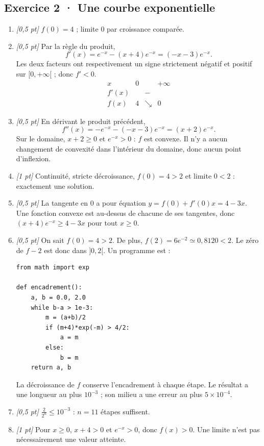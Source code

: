 \subsection*{Exercice 2 · Une courbe exponentielle}\begin{enumerate}

\item \textit{[0,5 pt]} $f(0)=4$ ; limite $0$ par croissance comparée.

\item \textit{[0,5 pt]} Par la règle du produit,
\[f'(x)=e^{-x}-(x+4)e^{-x}=(-x-3)e^{-x}.\]
Les deux facteurs ont respectivement un signe strictement négatif et positif sur $[0,+\infty[$ ; donc $f'<0$.
\[\begin{array}{c|ccc}x&0&&+\infty\\\hline f'(x)&&-&\\\hline f(x)&4&\searrow&0\end{array}\]

\item \textit{[0,5 pt]} En dérivant le produit précédent,
\[f''(x)=-e^{-x}-(-x-3)e^{-x}=(x+2)e^{-x}.\]
Sur le domaine, $x+2\ge0$ et $e^{-x}>0$ : $f$ est convexe. Il n'y a aucun changement de convexité dans l'intérieur du domaine, donc aucun point d'inflexion.

\item \textit{[1 pt]} Continuité, stricte décroissance, $f(0)=4>2$ et limite $0<2$ : exactement une solution.

\item \textit{[0,5 pt]} La tangente en $0$ a pour équation $y=f(0)+f'(0)x=4-3x$. Une fonction convexe est au-dessus de chacune de ses tangentes, donc $(x+4)e^{-x}\ge 4-3x$ pour tout $x\ge0$.


\item \textit{[0,5 pt]} On sait $f(0)=4>2$. De plus, $f(2)=6e^{-2}\simeq0{,}8120<2$. Le zéro de $f-2$ est donc dans $]0,2[$. Un programme est :
\begin{lstlisting}
from math import exp

def encadrement():
    a, b = 0.0, 2.0
    while b-a > 1e-3:
        m = (a+b)/2
        if (m+4)*exp(-m) > 4/2:
            a = m
        else:
            b = m
    return a, b
\end{lstlisting}
La décroissance de $f$ conserve l'encadrement à chaque étape. Le résultat a une longueur au plus $10^{-3}$ ; son milieu a une erreur au plus $5\times10^{-4}$.

\item \textit{[0,5 pt]} $\frac{2}{2^n}\le10^{-3}$ : $n=11$ étapes suffisent.

\item \textit{[1 pt]} Pour $x\ge0$, $x+4>0$ et $e^{-x}>0$, donc $f(x)>0$. Une limite n'est pas nécessairement une valeur atteinte.

\end{enumerate}

